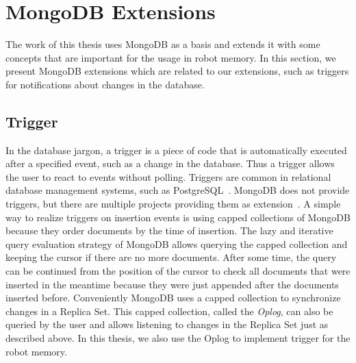 \section{MongoDB Extensions}
\label{sec:mongodb-extensions}
The work of this thesis uses MongoDB as a basis and extends it with
some concepts that are important for the usage in robot memory. In
this section, we present MongoDB extensions which are related to our
extensions, such as triggers for notifications about changes
in the database.

\subsection{Trigger}
\label{sec:mongodb-trigger}
In the database jargon, a trigger is a piece of code that is
automatically executed after a specified event, such as a change in
the database. Thus a trigger allows the user to react to events
without polling. Triggers are common in relational database management
systems, such as PostgreSQL~\cite{postgresql}. MongoDB does not
provide triggers, but there are multiple projects providing them as
extension~\cite{mongodb-trigger}. A simple way to realize
triggers on insertion events is using capped collections of MongoDB
because they order documents by the time of
insertion. The lazy and
iterative query evaluation strategy of MongoDB allows querying the
capped collection and keeping the cursor if there are no more
documents. After some time, the query can be continued from the
position of the cursor to check all documents that were inserted in the
meantime because they were just appended after the documents inserted
before. Conveniently MongoDB uses a capped collection to synchronize
changes in a Replica Set. This capped collection, called the
\emph{Oplog}, can also be queried by the user and allows listening to
changes in the Replica Set just as described above. In this thesis, we
also use the Oplog to implement trigger for the robot memory.

